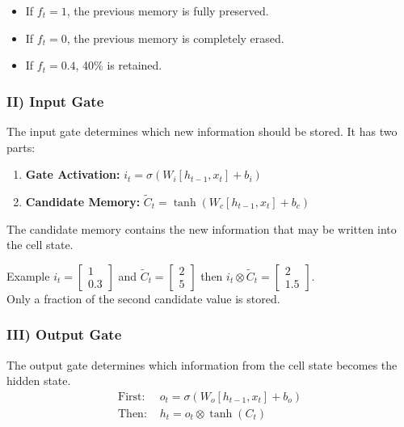 \begin{itemize}
    \item If $f_t = 1$, the previous memory is fully preserved.
    \item If $f_t = 0$, the previous memory is completely erased.
    \item If $f_t = 0.4$, 40\% is retained.
\end{itemize}

\subsubsection{II) Input Gate}

The input gate determines which new information should be stored. It has two parts:
\begin{enumerate}
    \item \textbf{Gate Activation:} $i_t = \sigma(W_i [h_{t-1}, x_t] + b_i)$
    \item \textbf{Candidate Memory:} $\tilde{C}_t = \tanh(W_c [h_{t-1}, x_t] + b_c)$
\end{enumerate}

The candidate memory contains the new information that may be written into the cell state.

\begin{propertybox}
Example $i_t = \begin{bmatrix} 1 \\ 0.3 \end{bmatrix}$ and $\tilde{C}_t = \begin{bmatrix} 2 \\ 5 \end{bmatrix}$ then $i_t \otimes \tilde{C}_t = \begin{bmatrix} 2 \\ 1.5 \end{bmatrix}$.\\
Only a fraction of the second candidate value is stored.
\end{propertybox}

\subsubsection{III) Output Gate}

The output gate determines which information from the cell state becomes the hidden state.
\begin{align}
\text{First: } & o_t = \sigma(W_o [h_{t-1}, x_t] + b_o) \\
\text{Then: } & h_t = o_t \otimes \tanh(C_t)
\end{align}

